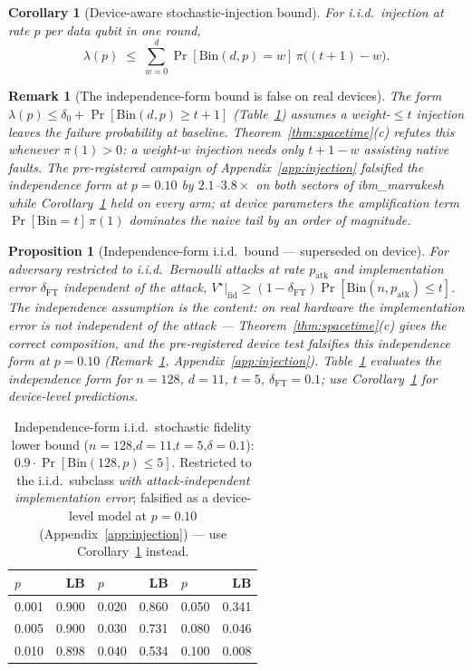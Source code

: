 \documentclass[11pt,a4paper]{article}
\newtheorem{corollary}{Corollary}\newtheorem{proposition}{Proposition}
\newtheorem{remark}{Remark}
\begin{document}
\begin{corollary}[Device-aware stochastic-injection bound]\label{cor:stoch}
For i.i.d.\ injection at rate $p$ per data qubit in one round,
\[
\lambda(p)\;\le\;\sum_{w=0}^{d}\Pr[\mathrm{Bin}(d,p)=w]\,
\pi\bigl((t{+}1)-w\bigr).
\]
\end{corollary}

\begin{remark}[The independence-form bound is false on real devices]
\label{rem:naive-false}
The form $\lambda(p)\le\delta_0+\Pr[\mathrm{Bin}(d,p)\ge t{+}1]$
(Table~\ref{tab:minimax}) assumes a weight-$\le t$ injection leaves the
failure probability at baseline. Theorem~\ref{thm:spacetime}(c) refutes
this whenever $\pi(1)>0$: a weight-$w$ injection needs only
$t{+}1{-}w$ assisting native faults. The pre-registered campaign of
Appendix~\ref{app:injection} falsified the independence form at
$p=0.10$ by $2.1$--$3.8\times$ on both sectors of ibm\_marrakesh while
Corollary~\ref{cor:stoch} held on every arm; at device parameters the
amplification term $\Pr[\mathrm{Bin}=t]\,\pi(1)$ dominates the naive
tail by an order of magnitude.
\end{remark}

\begin{proposition}[Independence-form i.i.d.\ bound --- superseded on device]\label{prop:stochastic}
For adversary restricted to i.i.d.\ Bernoulli attacks at rate $p_\mathrm{atk}$
and implementation error $\delta_\mathrm{FT}$ independent of the attack,
$V^\star|_\mathrm{iid}\ge(1-\delta_\mathrm{FT})\Pr[\mathrm{Bin}(n,p_\mathrm{atk})\le t]$.
\emph{The independence assumption is the content:} on real hardware the
implementation error is \emph{not} independent of the attack ---
Theorem~\ref{thm:spacetime}(c) gives the correct composition, and the
pre-registered device test falsifies this independence form at
$p=0.10$ (Remark~\ref{rem:naive-false}, Appendix~\ref{app:injection}).
Table~\ref{tab:minimax} evaluates the independence form for $n=128$,
$d=11$, $t=5$, $\delta_\mathrm{FT}=0.1$; use
Corollary~\ref{cor:stoch} for device-level predictions.
\end{proposition}

\begin{table}[H]\centering\small
\caption{Independence-form i.i.d.\ stochastic fidelity lower bound
  ($n=128$,$d=11$,$t=5$,$\delta=0.1$): $0.9\cdot\Pr[\mathrm{Bin}(128,p)\le5]$.
  Restricted to the i.i.d.\ subclass \emph{with attack-independent
  implementation error}; falsified as a device-level model at $p=0.10$
  (Appendix~\ref{app:injection}) --- use Corollary~\ref{cor:stoch}
  instead.}\label{tab:minimax}
\begin{tabular}{@{}lrlrlr@{}}
\toprule
$p$ & LB & $p$ & LB & $p$ & LB \\\midrule
0.001 & 0.900 & 0.020 & 0.860 & 0.050 & 0.341 \\
0.005 & 0.900 & 0.030 & 0.731 & 0.080 & 0.046 \\
0.010 & 0.898 & 0.040 & 0.534 & 0.100 & 0.008 \\\bottomrule
\end{tabular}
\end{table}
\end{document}
